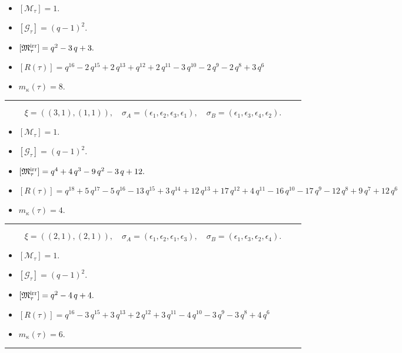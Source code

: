 \documentclass[10pt,a4paper]{amsart}
\begin{document}
\begin{itemize}
 \item $[\mathcal{M}_{\tau}] = 1 .$

 \item $[\mathcal{G}_{\tau}] = {\left(q - 1\right)}^{2} .$

 \item $[{\frak M}_{\tau}^{\textrm{irr}}] = q^{2} - 3 \, q + 3 .$

 \item $[R(\tau)] = q^{16} - 2 \, q^{15} + 2 \, q^{13} + q^{12} + 2 \, q^{11} - 3 \, q^{10} - 2 \, q^{9} - 2 \, q^{8} + 3 \, q^{6} $

 \item $m_{\kappa}(\tau) = 8 .$

 \end{itemize}
\noindent\rule{8cm}{0.4pt}

$$\xi = ({(3, 1), (1, 1)}),\quad \sigma_A = ({{\epsilon_1, \epsilon_2, \epsilon_3}, {\epsilon_1}}),\quad \sigma_B = ({{\epsilon_1, \epsilon_3, \epsilon_4}, {\epsilon_2}}).$$

\begin{itemize}
 \item $[\mathcal{M}_{\tau}] = 1 .$

 \item $[\mathcal{G}_{\tau}] = {\left(q - 1\right)}^{2} .$

 \item $[{\frak M}_{\tau}^{\textrm{irr}}] = q^{4} + 4 \, q^{3} - 9 \, q^{2} - 3 \, q + 12 .$

 \item $[R(\tau)] = q^{18} + 5 \, q^{17} - 5 \, q^{16} - 13 \, q^{15} + 3 \, q^{14} + 12 \, q^{13} + 17 \, q^{12} + 4 \, q^{11} - 16 \, q^{10} - 17 \, q^{9} - 12 \, q^{8} + 9 \, q^{7} + 12 \, q^{6} $

 \item $m_{\kappa}(\tau) = 4 .$

 \end{itemize}
\noindent\rule{8cm}{0.4pt}

$$\xi = ({(2, 1), (2, 1)}),\quad \sigma_A = ({{\epsilon_1, \epsilon_2}, {\epsilon_1, \epsilon_3}}),\quad \sigma_B = ({{\epsilon_1, \epsilon_3}, {\epsilon_2, \epsilon_4}}).$$

\begin{itemize}
 \item $[\mathcal{M}_{\tau}] = 1 .$

 \item $[\mathcal{G}_{\tau}] = {\left(q - 1\right)}^{2} .$

 \item $[{\frak M}_{\tau}^{\textrm{irr}}] = q^{2} - 4 \, q + 4 .$

 \item $[R(\tau)] = q^{16} - 3 \, q^{15} + 3 \, q^{13} + 2 \, q^{12} + 3 \, q^{11} - 4 \, q^{10} - 3 \, q^{9} - 3 \, q^{8} + 4 \, q^{6} $

 \item $m_{\kappa}(\tau) = 6 .$

 \end{itemize}
\noindent\rule{8cm}{0.4pt}
\end{document}
